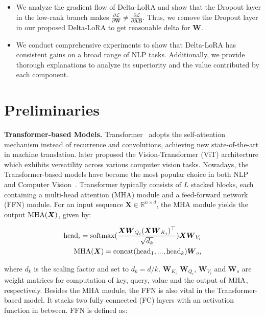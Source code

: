 {\begin{itemize}[leftmargin=*]
    \item We analyze the gradient flow of Delta-LoRA and show that the Dropout layer in the low-rank branch makes $\frac{\partial {\mathcal{L}}}{\partial \boldsymbol{W}} \neq \frac{\partial {\mathcal{L}}}{\partial \boldsymbol{A}\boldsymbol{B}}$. Thus, we remove the Dropout layer in our proposed Delta-LoRA to get reasonable delta for $\boldsymbol{W}$. 

    \item We conduct comprehensive experiments to show that Delta-LoRA has consistent gains on a broad range of NLP tasks. Additionally, we provide thorough explanations to analyze its superiority and the value contributed by each component.
\end{itemize}

\section{Preliminaries}

\textbf{Transformer-based Models.} Transformer~\citep{attention_is_all_you_need_vaswani2017attention} adopts the self-attention mechanism instead of recurrence and convolutions, achieving new state-of-the-art in machine translation. 
\citet{vit_dosovitskiy2020image} later proposed the Vision-Transformer (ViT)  architecture which exhibits versatility across various computer vision tasks. Nowadays, the Transformer-based models have become the most popular choice in both NLP and Computer Vision~\citep{ALBEF_li2021align,od_carion2020end,segmformer_zheng2021rethinking}. Transformer typically consists of $L$ stacked blocks, each containing a multi-head attention (MHA) module and a feed-forward network (FFN) module. For an input sequence $\boldsymbol{X} \in \mathbb{R}^{n\times d}$, the MHA module yields the output $\textup{MHA}(\boldsymbol{X})$, given by:

\begin{equation}
\begin{split}
    \textup{head}_i = \textup{softmax}(\frac{\boldsymbol{X}\boldsymbol{W}_{Q_i} (\boldsymbol{X}\boldsymbol{W}_{K_i})^{\top}}{\sqrt{d_k}})\boldsymbol{X}\boldsymbol{W}_{V_i} \\
    \textup{MHA}(\boldsymbol{X}) = \textup{concat}(\textup{head}_1,...,\textup{head}_k)\boldsymbol{W}_o,
\end{split}
\end{equation}

where $d_k$ is the scaling factor and set to $d_k = d/k$. $\boldsymbol{W}_{K_i}$ $\boldsymbol{W}_{Q_i}$, $\boldsymbol{W}_{V_i}$ and $\boldsymbol{W}_o$ are weight matrices for computation of key, query, value and the output of $\textup{MHA}$, respectively. Besides the MHA module, the FFN is also vital in the Transformer-based model. It stacks two fully connected (FC) layers with an activation function in between. FFN is defined as:

}
